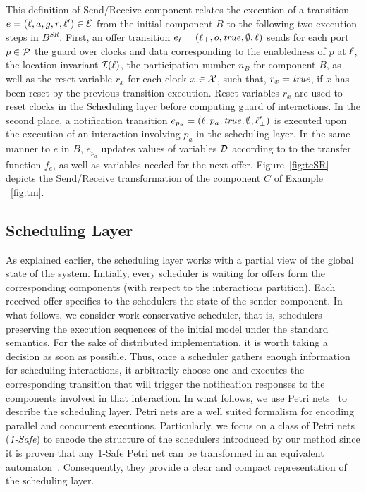 This definition of Send/Receive component relates the execution of a transition 
$e=(\ell,a,g,r,\ell')\in\mathcal{E}$ from the initial component $B$ to the following two 
execution steps in $B^{SR}$. First, an offer transition $e_{\ell}=(\ell_{\perp},o,\textnormal{\textit{true}},\emptyset,\ell)$
sends for each port $p\in\mathcal{P}$ the guard over clocks and data corresponding to the enabledness
of $p$ at $\ell$, the location invariant $\mathcal{I}(\ell)$, the participation number $n_B$ for
component $B$, as well as the reset variable $r_x$ for each clock $x\in\mathcal{X}$, such that,
$r_x=\textnormal{\textit{true}}$, if $x$ has been reset by the previous transition execution. Reset variables
$r_x$ are used to reset clocks in the Scheduling layer before computing guard of interactions.
In the second place, a notification transition $e_{p_a}=(\ell,p_a,\textnormal{\textit{true}},\emptyset,\ell_{\perp}')$  
is executed upon the execution of an interaction involving $p_a$ in the scheduling layer. 
In the same manner to $e$ in $B$, $e_{p_a}$ updates values of variables $\mathcal{D}$ according to
to the transfer function $f_e$, as well as variables needed for the next offer. 
Figure~\ref{fig:tcSR} depicts the Send/Receive transformation of the component $C$ of Example
~\ref{fig:tm}.

\subsection{Scheduling Layer}
As explained earlier, the scheduling layer works with a partial view of the global state of 
the system. Initially, every scheduler is waiting for offers form the corresponding components
(with respect to the interactions partition). Each received offer specifies to the schedulers
the state of the sender component. In what follows, we consider work-conservative scheduler,
that is, schedulers preserving the execution sequences of the initial model under
the standard semantics. For the sake of distributed implementation, it is
worth taking a decision as soon as possible. Thus, once a scheduler gathers enough information 
for scheduling interactions, it arbitrarily choose one and executes the corresponding 
transition that will trigger the notification responses to the components involved in 
that interaction.
In what follows, we use Petri nets~\cite{} to describe the scheduling layer. 
Petri nets are a well suited formalism for encoding parallel and concurrent executions. 
Particularly, we focus on a class of Petri nets (\emph{1-Safe}) to encode the structure of 
the schedulers introduced by our method since it is proven that any 1-Safe Petri net can be 
transformed in an equivalent automaton~\cite{}. 
Consequently, they provide a clear and compact representation 
of the scheduling layer.

